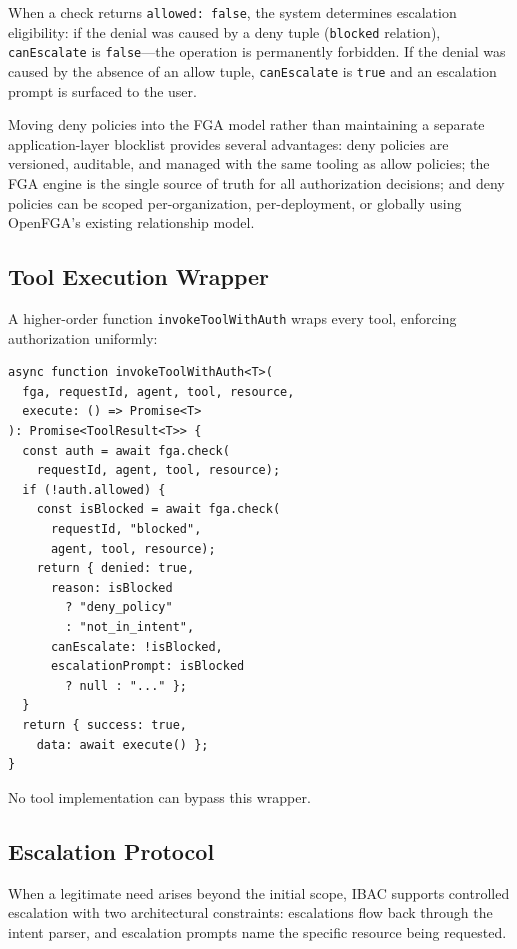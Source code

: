 \documentclass[11pt]{article}
\begin{document}
When a check returns \texttt{allowed: false}, the system determines escalation eligibility: if the denial was caused by a deny tuple (\texttt{blocked} relation), \texttt{canEscalate} is \texttt{false}---the operation is permanently forbidden. If the denial was caused by the absence of an allow tuple, \texttt{canEscalate} is \texttt{true} and an escalation prompt is surfaced to the user.

Moving deny policies into the FGA model rather than maintaining a separate application-layer blocklist provides several advantages: deny policies are versioned, auditable, and managed with the same tooling as allow policies; the FGA engine is the single source of truth for all authorization decisions; and deny policies can be scoped per-organization, per-deployment, or globally using OpenFGA's existing relationship model.

\subsection{Tool Execution Wrapper}

A higher-order function \texttt{invokeToolWithAuth} wraps every tool, enforcing authorization uniformly:

\begin{lstlisting}[language={}]
async function invokeToolWithAuth<T>(
  fga, requestId, agent, tool, resource,
  execute: () => Promise<T>
): Promise<ToolResult<T>> {
  const auth = await fga.check(
    requestId, agent, tool, resource);
  if (!auth.allowed) {
    const isBlocked = await fga.check(
      requestId, "blocked",
      agent, tool, resource);
    return { denied: true,
      reason: isBlocked
        ? "deny_policy"
        : "not_in_intent",
      canEscalate: !isBlocked,
      escalationPrompt: isBlocked
        ? null : "..." };
  }
  return { success: true,
    data: await execute() };
}
\end{lstlisting}

No tool implementation can bypass this wrapper.

\subsection{Escalation Protocol}

When a legitimate need arises beyond the initial scope, IBAC supports controlled escalation with two architectural constraints: escalations flow back through the intent parser, and escalation prompts name the specific resource being requested.
\end{document}
